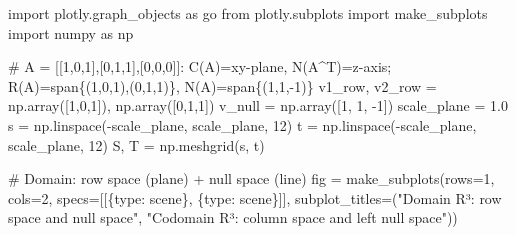 \documentclass[
  letterpaper,
  DIV=11,
  numbers=noendperiod]{scrartcl}
\newenvironment{Shaded}{\begin{snugshade}}{\end{snugshade}}
\newcommand{\CommentTok}[1]{\textcolor[rgb]{0.37,0.37,0.37}{#1}}
\newcommand{\DecValTok}[1]{\textcolor[rgb]{0.68,0.00,0.00}{#1}}
\newcommand{\FloatTok}[1]{\textcolor[rgb]{0.68,0.00,0.00}{#1}}
\newcommand{\ImportTok}[1]{\textcolor[rgb]{0.00,0.46,0.62}{#1}}
\newcommand{\NormalTok}[1]{\textcolor[rgb]{0.00,0.23,0.31}{#1}}
\newcommand{\OperatorTok}[1]{\textcolor[rgb]{0.37,0.37,0.37}{#1}}
\newcommand{\StringTok}[1]{\textcolor[rgb]{0.13,0.47,0.30}{#1}}
\begin{document}
\begin{Shaded}
\begin{Highlighting}[]
\ImportTok{import}\NormalTok{ plotly.graph\_objects }\ImportTok{as}\NormalTok{ go}
\ImportTok{from}\NormalTok{ plotly.subplots }\ImportTok{import}\NormalTok{ make\_subplots}
\ImportTok{import}\NormalTok{ numpy }\ImportTok{as}\NormalTok{ np}

\CommentTok{\# A = [[1,0,1],[0,1,1],[0,0,0]]: C(A)=xy{-}plane, N(A\^{}T)=z{-}axis; R(A)=span\{(1,0,1),(0,1,1)\}, N(A)=span\{(1,1,{-}1)\}}
\NormalTok{v1\_row, v2\_row }\OperatorTok{=}\NormalTok{ np.array([}\DecValTok{1}\NormalTok{,}\DecValTok{0}\NormalTok{,}\DecValTok{1}\NormalTok{]), np.array([}\DecValTok{0}\NormalTok{,}\DecValTok{1}\NormalTok{,}\DecValTok{1}\NormalTok{])}
\NormalTok{v\_null }\OperatorTok{=}\NormalTok{ np.array([}\DecValTok{1}\NormalTok{, }\DecValTok{1}\NormalTok{, }\OperatorTok{{-}}\DecValTok{1}\NormalTok{])}
\NormalTok{scale\_plane }\OperatorTok{=} \FloatTok{1.0}
\NormalTok{s }\OperatorTok{=}\NormalTok{ np.linspace(}\OperatorTok{{-}}\NormalTok{scale\_plane, scale\_plane, }\DecValTok{12}\NormalTok{)}
\NormalTok{t }\OperatorTok{=}\NormalTok{ np.linspace(}\OperatorTok{{-}}\NormalTok{scale\_plane, scale\_plane, }\DecValTok{12}\NormalTok{)}
\NormalTok{S, T }\OperatorTok{=}\NormalTok{ np.meshgrid(s, t)}

\CommentTok{\# Domain: row space (plane) + null space (line)}
\NormalTok{fig }\OperatorTok{=}\NormalTok{ make\_subplots(rows}\OperatorTok{=}\DecValTok{1}\NormalTok{, cols}\OperatorTok{=}\DecValTok{2}\NormalTok{, specs}\OperatorTok{=}\NormalTok{[[\{}\StringTok{\textquotesingle{}type\textquotesingle{}}\NormalTok{: }\StringTok{\textquotesingle{}scene\textquotesingle{}}\NormalTok{\}, \{}\StringTok{\textquotesingle{}type\textquotesingle{}}\NormalTok{: }\StringTok{\textquotesingle{}scene\textquotesingle{}}\NormalTok{\}]],}
\NormalTok{                    subplot\_titles}\OperatorTok{=}\NormalTok{(}\StringTok{"Domain R³: row space and null space"}\NormalTok{, }\StringTok{"Codomain R³: column space and left null space"}\NormalTok{))}


\end{Highlighting}
\end{Shaded}
\end{document}
